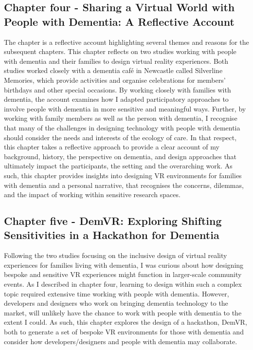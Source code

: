 \subsection{Chapter four - Sharing a Virtual World with People with Dementia: A Reflective Account}
\label{Intro:ChapterFour}
The chapter is a reflective account highlighting several themes and reasons for the subsequent chapters. This chapter reflects on two studies working with people with dementia and their families to design virtual reality experiences. Both studies worked closely with a dementia café in Newcastle called Silverline Memories, which provide activities and organise celebrations for members' birthdays and other special occasions. By working closely with families with dementia, the account examines how I adapted participatory approaches to involve people with dementia in more sensitive and meaningful ways. Further, by working with family members as well as the person with dementia, I recognise that many of the challenges in designing technology with people with dementia should consider the needs and interests of the ecology of care. In that respect, this chapter takes a reflective approach to provide a clear account of my background, history, the perspective on dementia, and design approaches that ultimately impact the participants, the setting and the overarching work. As such, this chapter provides insights into designing VR environments for families with dementia and a personal narrative, that recognises the concerns, dilemmas, and the impact of working within sensitive research spaces.

\subsection{Chapter five - DemVR: Exploring Shifting Sensitivities in a Hackathon for Dementia}
\label{Intro:ChapterFive}
Following the two studies focusing on the inclusive design of virtual reality experiences for families living with dementia, I was curious about how designing bespoke and sensitive VR experiences might function in larger-scale community events. As I described in chapter four, learning to design within such a complex topic required extensive time working with people with dementia. However, developers and designers who work on bringing dementia technology to the market, will unlikely have the chance to work with people with dementia to the extent I could. As such, this chapter explores the design of a hackathon, DemVR, both to generate a set of bespoke VR environments for those with dementia and consider how developers/designers and people with dementia may collaborate.

